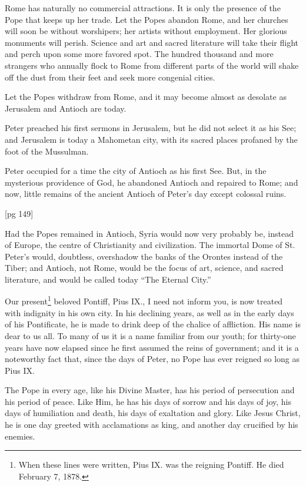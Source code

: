 Rome has naturally no commercial attractions.
It is only the presence of the Pope that keeps up
her trade. Let the Popes abandon Rome, and her
churches will soon be without worshipers; her
artists without employment. Her glorious monuments
will perish. Science and art and sacred
literature will take their flight and perch upon
some more favored spot. The hundred thousand
and more strangers who annually flock to Rome
from different parts of the world will shake off the
dust from their feet and seek more congenial cities.

Let the Popes withdraw from Rome, and it may
become almost as desolate as Jerusalem and Antioch
are today.

Peter preached his first sermons in Jerusalem,
but he did not select it as his See; and Jerusalem
is today a Mahometan city, with its sacred places
profaned by the foot of the Mussulman.

Peter occupied for a time the city of Antioch as
his first See. But, in the mysterious providence of
God, he abandoned Antioch and repaired to Rome;
and now, little remains of the ancient Antioch of
Peter's day except colossal ruins.

[pg 149]

Had the Popes remained in Antioch, Syria would
now very probably be, instead of Europe, the centre
of Christianity and civilization. The immortal
Dome of St. Peter's would, doubtless, overshadow
the banks of the Orontes instead of the Tiber; and
Antioch, not Rome, would be the focus of art,
science, and sacred literature, and would be called
today “The Eternal City.”

Our present\footnote{When these lines
were written, Pius IX. was the reigning Pontiff.
He died February 7, 1878.} beloved Pontiff, Pius IX., I need
not inform you, is now treated with indignity in
his own city. In his declining years, as well as in
the early days of his Pontificate, he is made to
drink deep of the chalice of affliction. His name is
dear to us all. To many of us it is a name familiar
from our youth; for thirty-one years have now
elapsed since he first assumed the reins of government;
and it is a noteworthy fact that, since
the days of Peter, no Pope has ever reigned so
long as Pius IX.

The Pope in every age, like his Divine Master,
has his period of persecution and his period of
peace. Like Him, he has his days of sorrow and
his days of joy, his days of humiliation and death,
his days of exaltation and glory. Like Jesus
Christ, he is one day greeted with acclamations as
king, and another day crucified by his enemies.

